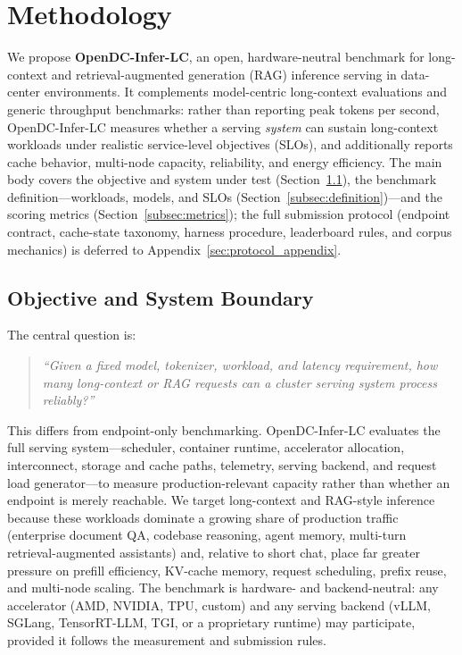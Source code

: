 \section{Methodology}
\label{sec:methodology}

We propose \textbf{OpenDC-Infer-LC}, an open, hardware-neutral benchmark for
long-context and retrieval-augmented generation (RAG) inference serving in
data-center environments. It complements model-centric long-context evaluations
and generic throughput benchmarks: rather than reporting peak tokens per second,
OpenDC-Infer-LC measures whether a serving \emph{system} can sustain long-context
workloads under realistic service-level objectives (SLOs), and additionally
reports cache behavior, multi-node capacity, reliability, and energy efficiency.
The main body covers the objective and system under test
(Section~\ref{subsec:objective}), the benchmark definition---workloads, models,
and SLOs (Section~\ref{subsec:definition})---and the scoring metrics
(Section~\ref{subsec:metrics}); the full submission protocol (endpoint contract,
cache-state taxonomy, harness procedure, leaderboard rules, and corpus mechanics)
is deferred to Appendix~\ref{sec:protocol_appendix}.

\subsection{Objective and System Boundary}
\label{subsec:objective}
The central question is:
\vspace{-0.25\baselineskip}
\begin{quote}\itshape
``Given a fixed model, tokenizer, workload, and latency requirement, how many
long-context or RAG requests can a cluster serving system process reliably?''
\end{quote}
\vspace{-0.25\baselineskip}

This differs from endpoint-only benchmarking. OpenDC-Infer-LC evaluates the full
serving system---scheduler, container runtime, accelerator allocation,
interconnect, storage and cache paths, telemetry, serving backend, and request
load generator---to measure production-relevant capacity rather than whether an
endpoint is merely reachable. We target long-context and RAG-style inference
because these workloads dominate a growing share of production traffic (enterprise
document QA, codebase reasoning, agent memory, multi-turn retrieval-augmented
assistants) and, relative to short chat, place far greater pressure on prefill
efficiency, KV-cache memory, request scheduling, prefix reuse, and multi-node
scaling. The benchmark is hardware- and backend-neutral: any accelerator (AMD,
NVIDIA, TPU, custom) and any serving backend (vLLM, SGLang, TensorRT-LLM, TGI, or a
proprietary runtime) may participate, provided it follows the measurement and
submission rules.

